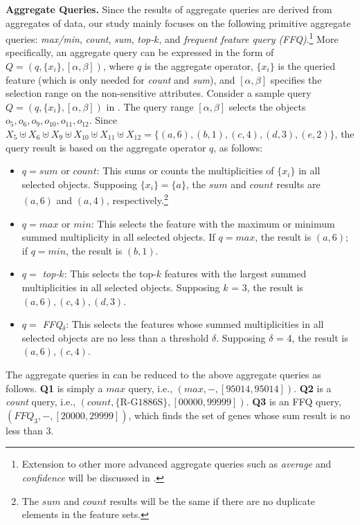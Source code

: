 \textbf{Aggregate Queries.} Since the results of aggregate queries are derived from aggregates of data, our study mainly focuses on the following primitive aggregate queries: \emph{max/min}, \emph{count}, \emph{sum}, \emph{top-$k$}, and \emph{frequent feature query (FFQ)}.\footnote{Extension to other more advanced aggregate queries such as \emph{average} and \emph{confidence} will be discussed in .} More specifically, an aggregate query can be expressed in the form of $Q = (q, \{x_i\}, [\alpha, \beta])$, where $q$ is the aggregate operator, $\{x_i\}$ is the queried feature (which is only needed for \emph{count} and \emph{sum}), and $[\alpha, \beta]$ specifies the selection range on the non-sensitive attributes. Consider a sample query $Q = (q, \{x_i\}, [\alpha, \beta])$ in . The query range $[\alpha, \beta]$ selects the objects $o_5, o_6, o_9, o_{10}, o_{11}, o_{12}$. Since $X _5 \uplus X_6 \uplus X_9 \uplus X_{10} \uplus X_{11} \uplus X_{12} = \{(a, 6), (b, 1), (c, 4), (d, 3), (e, 2)\}$, the query result is based on the aggregate operator $q$, as follows:
\begin{itemize}
  \item $q=sum$ or $count$: This sums or counts the multiplicities of $\{x_i\}$ in all selected objects. Supposing $\{x_i\} = \{a\}$, the $sum$ and $count$ results are $(a, 6)$ and $(a, 4)$, respectively.\footnote{The $sum$ and $count$ results will be the same if there are no duplicate elements in the feature sets.}
  \item $q=max$ or $min$: This selects the feature with the maximum or minimum summed multiplicity in all selected objects. If $q=max$, the result is $(a, 6)$; if $q=min$, the result is $(b, 1)$. %
  \item $q=$ \emph{top-$k$}: This selects the top-$k$ features with the largest summed multiplicities in all selected objects. Supposing $k$ = 3, the result is $(a, 6), (c, 4), (d, 3)$.
  \item $q=$ \emph{FFQ$_\delta$}: This selects the features whose summed multiplicities in all selected objects are no less than a threshold $\delta$. Supposing $\delta$ = 4, the result is $(a, 6), (c, 4)$.
\end{itemize}

The aggregate queries in  can be reduced to the above aggregate queries as follows. \textbf{Q1} is simply a $max$ query, i.e., $(max, -, [95014, 95014])$. \textbf{Q2} is a \emph{count} query, i.e., $(count, \{\text{R-G1886S}\}, [00000, 99999])$. \textbf{Q3} is an FFQ query, $(FFQ_3, -, [20000, 29999])$, which finds the set of genes whose sum result is no less than 3. %

